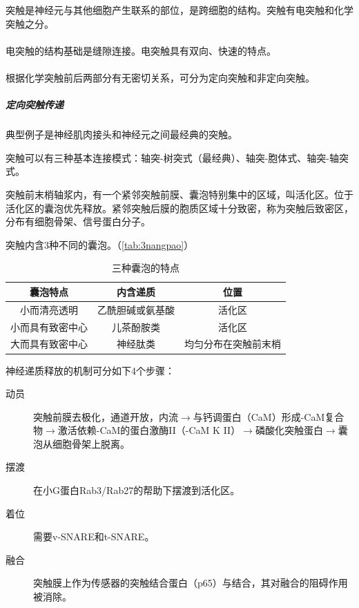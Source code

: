 突触是神经元与其他细胞产生联系的部位，是跨细胞的结构。突触有电突触和化学突触之分。

\paragraph{}

电突触的结构基础是缝隙连接。电突触具有双向、快速的特点。

\paragraph{}

根据化学突触前后两部分有无密切关系，可分为定向突触和非定向突触。

\subparagraph{定向突触传递}

典型例子是神经肌肉接头和神经元之间最经典的突触。

突触可以有三种基本连接模式：轴突-树突式（最经典）、轴突-胞体式、轴突-轴突式。

突触前末梢轴浆内，有一个紧邻突触前膜、囊泡特别集中的区域，叫活化区。位于活化区的囊泡优先释放。紧邻突触后膜的胞质区域十分致密，称为突触后致密区，分布有细胞骨架、信号蛋白分子。

突触内含3种不同的囊泡。（\autoref{tab:3nangpao}）

\begin{table}[htbp]
	\centering
	\begin{tabularx}{\textwidth}{|C|C|C|}
		\hline
		\textbf{囊泡特点} & \textbf{内含递质} & \textbf{位置} \\ \hline
		小而清亮透明 & 乙酰胆碱或氨基酸 & 活化区 \\ \hline
		小而具有致密中心 & 儿茶酚胺类 & 活化区 \\ \hline
		大而具有致密中心 & 神经肽类 & 均匀分布在突触前末梢 \\ \hline
	\end{tabularx}
	\caption{三种囊泡的特点}
	\label{tab:3nangpao}
\end{table}

神经递质释放的机制可分如下4个步骤：
\begin{description}
	\item[动员] 突触前膜去极化，通道开放，内流$\longrightarrow$与钙调蛋白（CaM）形成-CaM复合物$\longrightarrow$激活依赖-CaM的蛋白激酶II（-CaM K II）$\longrightarrow$磷酸化突触蛋白$\longrightarrow$囊泡从细胞骨架上脱离。
	\item[摆渡] 在小G蛋白Rab3/Rab27的帮助下摆渡到活化区。
	\item[着位] 需要v-SNARE和t-SNARE。
	\item[融合] 突触膜上作为传感器的突触结合蛋白（p65）与结合，其对融合的阻碍作用被消除。
\end{description}







